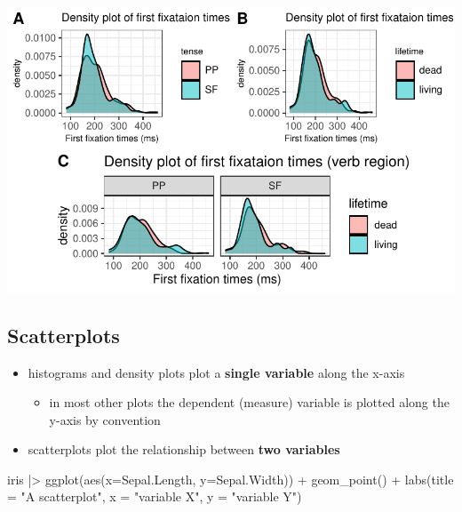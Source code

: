 \documentclass[
  letterpaper,
  DIV=11,
  numbers=noendperiod]{scrartcl}
\newenvironment{Shaded}{\begin{snugshade}}{\end{snugshade}}
\newcommand{\AttributeTok}[1]{\textcolor[rgb]{0.40,0.45,0.13}{#1}}
\newcommand{\FunctionTok}[1]{\textcolor[rgb]{0.28,0.35,0.67}{#1}}
\newcommand{\NormalTok}[1]{\textcolor[rgb]{0.00,0.23,0.31}{#1}}
\newcommand{\SpecialCharTok}[1]{\textcolor[rgb]{0.37,0.37,0.37}{#1}}
\newcommand{\StringTok}[1]{\textcolor[rgb]{0.13,0.47,0.30}{#1}}
\providecommand{\tightlist}{%
  \setlength{\itemsep}{0pt}\setlength{\parskip}{0pt}}\usepackage{longtable,booktabs,array}
\begin{document}
\includegraphics{_data_viz_files/figure-pdf/unnamed-chunk-23-1.pdf}

\hypertarget{scatterplots}{%
\subsection{Scatterplots}\label{scatterplots}}

\begin{itemize}
\tightlist
\item
  histograms and density plots plot a \textbf{single variable} along the
  x-axis

  \begin{itemize}
  \tightlist
  \item
    in most other plots the dependent (measure) variable is plotted
    along the y-axis by convention
  \end{itemize}
\item
  scatterplots plot the relationship between \textbf{two variables}
\end{itemize}

\begin{Shaded}
\begin{Highlighting}[]
\NormalTok{iris }\SpecialCharTok{|\textgreater{}} 
  \FunctionTok{ggplot}\NormalTok{(}\FunctionTok{aes}\NormalTok{(}\AttributeTok{x=}\NormalTok{Sepal.Length, }\AttributeTok{y=}\NormalTok{Sepal.Width)) }\SpecialCharTok{+}
  \FunctionTok{geom\_point}\NormalTok{() }\SpecialCharTok{+}
  \FunctionTok{labs}\NormalTok{(}\AttributeTok{title =} \StringTok{"A scatterplot"}\NormalTok{,}
       \AttributeTok{x =} \StringTok{"variable X"}\NormalTok{,}
       \AttributeTok{y =} \StringTok{"variable Y"}\NormalTok{)}
\end{Highlighting}
\end{Shaded}
\end{document}
